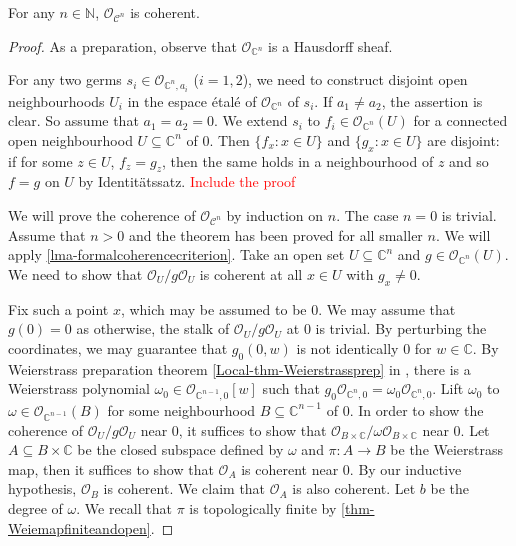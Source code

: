 \begin{lemma}[Oka]\label{lma-Okacoh}
    For any $n\in \mathbb{N}$, $\mathcal{O}_{\mathcal{C}^n}$ is coherent.
\end{lemma}
\begin{proof}
    As a preparation, observe that $\mathcal{O}_{\mathbb{C}^n}$ is a Hausdorff sheaf.
    
    For any two germs $s_i\in \mathcal{O}_{\mathbb{C}^n,a_i}$ ($i=1,2$), we need to construct disjoint open neighbourhoods $U_i$ in the espace étalé of $\mathcal{O}_{\mathbb{C}^n}$ of $s_i$. If $a_1\neq a_2$, the assertion is clear. So assume that $a_1=a_2=0$. We extend $s_i$ to $f_i\in \mathcal{O}_{\mathbb{C}^n}(U)$ for a connected open neighbourhood $U\subseteq \mathbb{C}^n$ of $0$. Then $\{f_x:x\in U\}$ and $\{g_x:x\in U\}$ are disjoint: if for some $z\in U$, $f_z=g_z$, then the same holds in a neighbourhood of $z$ and so $f=g$ on $U$ by Identitätssatz. \textcolor{red}{Include the proof}

    We will prove the coherence of $\mathcal{O}_{\mathcal{C}^n}$ by induction on $n$. The case $n=0$ is trivial. Assume that $n>0$ and the theorem has been proved for all smaller $n$. We will apply \cref{lma-formalcoherencecriterion}. Take an open set $U\subseteq \mathbb{C}^n$ and $g\in \mathcal{O}_{\mathbb{C}^n}(U)$. We need to show that $\mathcal{O}_U/g\mathcal{O}_U$ is coherent at all $x\in U$ with $g_x\neq 0$.

    Fix such a point $x$, which may be assumed to be $0$. We may assume that $g(0)=0$ as otherwise, the stalk of $\mathcal{O}_U/g\mathcal{O}_U$ at $0$ is trivial. By perturbing the coordinates, we may guarantee that $g_0(0,w)$ is not identically $0$ for $w\in \mathbb{C}$. By Weierstrass preparation theorem \cref{Local-thm-Weierstrassprep} in , there is a Weierstrass polynomial $\omega_0\in \mathcal{O}_{\mathbb{C}^{n-1},0}[w]$ such that $g_0\mathcal{O}_{\mathbb{C}^n,0}=\omega_0\mathcal{O}_{\mathbb{C}^n,0}$. Lift $\omega_0$ to $\omega\in \mathcal{O}_{\mathbb{C}^{n-1}}(B)$ for some neighbourhood $B\subseteq \mathbb{C}^{n-1}$ of $0$. In order to show the coherence of $\mathcal{O}_U/g\mathcal{O}_U$ near $0$, it suffices to show that $\mathcal{O}_{B\times \mathbb{C}}/\omega \mathcal{O}_{B\times \mathbb{C}}$ near $0$. Let $A\subseteq B\times \mathbb{C}$ be the closed subspace defined by $\omega$ and $\pi:A\rightarrow B$ be the Weierstrass map, then it suffices to show that $\mathcal{O}_{A}$ is coherent near $0$. By our inductive hypothesis, $\mathcal{O}_B$ is coherent. We claim that $\mathcal{O}_A$ is also coherent. Let $b$ be the degree of $\omega$. We recall that $\pi$ is topologically finite by \cref{thm-Weiemapfiniteandopen}.


\end{proof}
